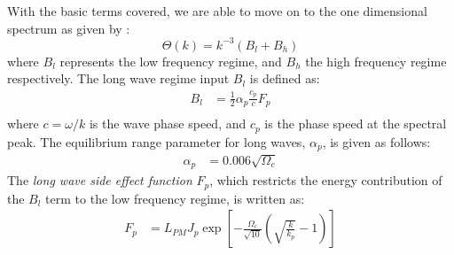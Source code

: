 %
With the basic terms covered, we are able to move on to the one dimensional 
\wavenumber spectrum as given by \citet{article:Elfouhaily1997}:
%
\begin{equation}
 \Theta(k) = k^{-3}(B_l + B_h)
\end{equation}
%
where $B_l$ represents the low frequency regime, and $B_h$ the high frequency
regime respectively. The long wave regime input $B_l$ is defined as:
\begin{align*}
 B_l &= \frac{1}{2}\alpha_p\frac{c_p}{c}F_p \\
\end{align*}
where $c = \omega/k$ is the wave phase speed, and $c_p$ is the phase speed at
the spectral peak. The equilibrium range parameter for long waves, $\alpha_p$,
is given as follows:
\begin{align*}
 \alpha_p &= 0.006\sqrt{\Omega_c}
\end{align*}
The \emph{long wave side effect function} $F_p$, which restricts the
energy contribution of the $B_l$ term to the low frequency regime, is written
as:
\begin{align*}
 F_p &= L_{PM}J_p\exp\left[- 
 \frac{\Omega_c}{\sqrt{10}}\left(\sqrt{\frac{k}{k_p}} - 1\right)\right]
\end{align*}
%

